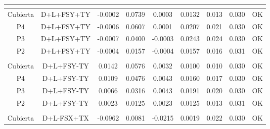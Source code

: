 \begin{table}[H]
{\begin{tabular}{|c|c|c|c|c|c|c|c|c|}
    \hline
    \multicolumn{1}{|r}{} & \multicolumn{1}{r}{} & \multicolumn{1}{r}{} & \multicolumn{1}{r}{} & \multicolumn{1}{r}{} & \multicolumn{1}{r}{} & \multicolumn{1}{r}{} & \multicolumn{1}{r}{} &  \bigstrut\\
    \hline
    Cubierta & D+L+FSY+TY & -0.0002 & 0.0739 & 0.0003 & 0.0132 & 0.013 & 0.030 & \cellcolor[rgb]{ .776,  .937,  .808}\textcolor[rgb]{ 0,  .38,  0}{OK} \bigstrut\\
    \hline
    P4  & D+L+FSY+TY & -0.0006 & 0.0607 & 0.0001 & 0.0207 & 0.021 & 0.030 & \cellcolor[rgb]{ .776,  .937,  .808}\textcolor[rgb]{ 0,  .38,  0}{OK} \bigstrut\\
    \hline
    P3  & D+L+FSY+TY & -0.0007 & 0.0400 & -0.0003 & 0.0243 & 0.024 & 0.030 & \cellcolor[rgb]{ .776,  .937,  .808}\textcolor[rgb]{ 0,  .38,  0}{OK} \bigstrut\\
    \hline
    P2  & D+L+FSY+TY & -0.0004 & 0.0157 & -0.0004 & 0.0157 & 0.016 & 0.031 & \cellcolor[rgb]{ .776,  .937,  .808}\textcolor[rgb]{ 0,  .38,  0}{OK} \bigstrut\\
    \hline
    \multicolumn{1}{|r}{} & \multicolumn{1}{r}{} & \multicolumn{1}{r}{} & \multicolumn{1}{r}{} & \multicolumn{1}{r}{} & \multicolumn{1}{r}{} & \multicolumn{1}{r}{} & \multicolumn{1}{r}{} &  \bigstrut\\
    \hline
    Cubierta & D+L+FSY-TY & 0.0142 & 0.0576 & 0.0032 & 0.0100 & 0.010 & 0.030 & \cellcolor[rgb]{ .776,  .937,  .808}\textcolor[rgb]{ 0,  .38,  0}{OK} \bigstrut\\
    \hline
    P4  & D+L+FSY-TY & 0.0109 & 0.0476 & 0.0043 & 0.0160 & 0.017 & 0.030 & \cellcolor[rgb]{ .776,  .937,  .808}\textcolor[rgb]{ 0,  .38,  0}{OK} \bigstrut\\
    \hline
    P3  & D+L+FSY-TY & 0.0066 & 0.0316 & 0.0043 & 0.0191 & 0.020 & 0.030 & \cellcolor[rgb]{ .776,  .937,  .808}\textcolor[rgb]{ 0,  .38,  0}{OK} \bigstrut\\
    \hline
    P2  & D+L+FSY-TY & 0.0023 & 0.0125 & 0.0023 & 0.0125 & 0.013 & 0.031 & \cellcolor[rgb]{ .776,  .937,  .808}\textcolor[rgb]{ 0,  .38,  0}{OK} \bigstrut\\
    \hline
    \multicolumn{1}{|r}{} & \multicolumn{1}{r}{} & \multicolumn{1}{r}{} & \multicolumn{1}{r}{} & \multicolumn{1}{r}{} & \multicolumn{1}{r}{} & \multicolumn{1}{r}{} & \multicolumn{1}{r}{} &  \bigstrut\\
    \hline
    Cubierta & D+L-FSX+TX & -0.0962 & 0.0081 & -0.0215 & 0.0019 & 0.022 & 0.030 & \cellcolor[rgb]{ .776,  .937,  .808}\textcolor[rgb]{ 0,  .38,  0}{OK} \bigstrut\\

\end{tabular}}
\end{table}
